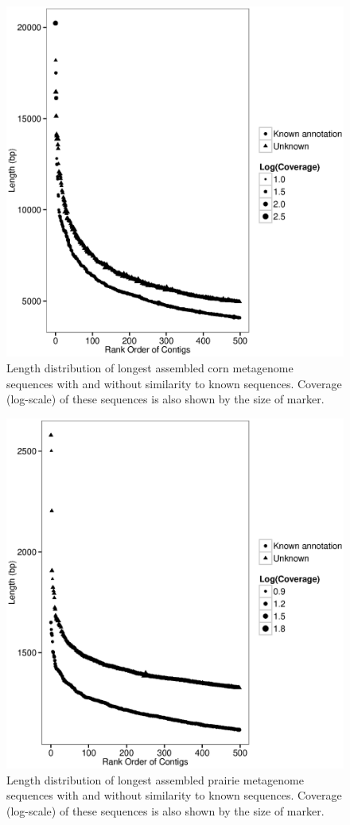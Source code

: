\documentclass{pnastwo}
\begin{document}
\begin{figure}
\begin{center}
\centerline{\includegraphics[width=.7\textwidth]{./figures/corn-cov-len-500.eps}}
\caption{Length distribution of longest assembled corn metagenome sequences with and without similarity to known sequences.  Coverage (log-scale) of these sequences is also shown by the size of marker. }
\label{cornlength}
\end{center}
\end{figure}

\begin{figure}
\begin{center}
\centerline{\includegraphics[width=.7\textwidth]{./figures/prairie-cov-len-500.eps}}
\caption{Length distribution of longest assembled prairie metagenome sequences with and without similarity to known sequences.  Coverage (log-scale) of these sequences is also shown by the size of marker. }
\label{prairielength}
\end{center}
\end{figure}
\end{document}
